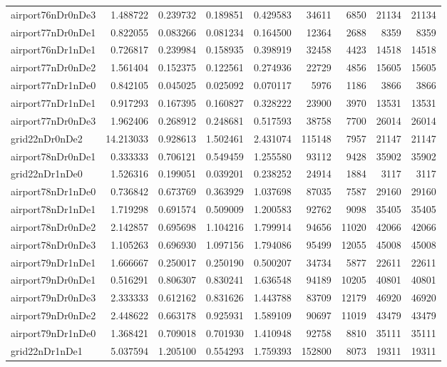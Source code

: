 \begin{longtable}{|l|r|r|r|r|r|r|r|r|}
airport76nDr0nDe3 & 1.488722 & 0.239732 & 0.189851 & 0.429583 & 34611 & 6850 & 21134 & 21134 \\
airport77nDr0nDe1 & 0.822055 & 0.083266 & 0.081234 & 0.164500 & 12364 & 2688 & 8359 & 8359 \\
airport76nDr1nDe1 & 0.726817 & 0.239984 & 0.158935 & 0.398919 & 32458 & 4423 & 14518 & 14518 \\
airport77nDr0nDe2 & 1.561404 & 0.152375 & 0.122561 & 0.274936 & 22729 & 4856 & 15605 & 15605 \\
airport77nDr1nDe0 & 0.842105 & 0.045025 & 0.025092 & 0.070117 & 5976 & 1186 & 3866 & 3866 \\
airport77nDr1nDe1 & 0.917293 & 0.167395 & 0.160827 & 0.328222 & 23900 & 3970 & 13531 & 13531 \\
airport77nDr0nDe3 & 1.962406 & 0.268912 & 0.248681 & 0.517593 & 38758 & 7700 & 26014 & 26014 \\
grid22nDr0nDe2 & 14.213033 & 0.928613 & 1.502461 & 2.431074 & 115148 & 7957 & 21147 & 21147 \\
airport78nDr0nDe1 & 0.333333 & 0.706121 & 0.549459 & 1.255580 & 93112 & 9428 & 35902 & 35902 \\
grid22nDr1nDe0 & 1.526316 & 0.199051 & 0.039201 & 0.238252 & 24914 & 1884 & 3117 & 3117 \\
airport78nDr1nDe0 & 0.736842 & 0.673769 & 0.363929 & 1.037698 & 87035 & 7587 & 29160 & 29160 \\
airport78nDr1nDe1 & 1.719298 & 0.691574 & 0.509009 & 1.200583 & 92762 & 9098 & 35405 & 35405 \\
airport78nDr0nDe2 & 2.142857 & 0.695698 & 1.104216 & 1.799914 & 94656 & 11020 & 42066 & 42066 \\
airport78nDr0nDe3 & 1.105263 & 0.696930 & 1.097156 & 1.794086 & 95499 & 12055 & 45008 & 45008 \\
airport79nDr1nDe1 & 1.666667 & 0.250017 & 0.250190 & 0.500207 & 34734 & 5877 & 22611 & 22611 \\
airport79nDr0nDe1 & 0.516291 & 0.806307 & 0.830241 & 1.636548 & 94189 & 10205 & 40801 & 40801 \\
airport79nDr0nDe3 & 2.333333 & 0.612162 & 0.831626 & 1.443788 & 83709 & 12179 & 46920 & 46920 \\
airport79nDr0nDe2 & 2.448622 & 0.663178 & 0.925931 & 1.589109 & 90697 & 11019 & 43479 & 43479 \\
airport79nDr1nDe0 & 1.368421 & 0.709018 & 0.701930 & 1.410948 & 92758 & 8810 & 35111 & 35111 \\
grid22nDr1nDe1 & 5.037594 & 1.205100 & 0.554293 & 1.759393 & 152800 & 8073 & 19311 & 19311 \\

\end{longtable}
